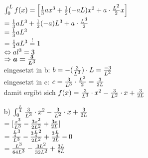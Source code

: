 \documentclass[a4paper]{article}
\begin{document}
\begin{description}
\begin{itemize}
									$\int_0^L f(x)= \left[\frac{1}{3}ax\textsuperscript{3}+\frac{1}{2}(-aL)x\textsuperscript{2}+a\cdot \frac{L\textsuperscript{2}}{2}x\right]$\\
									
									$=\frac{1}{3}aL\textsuperscript{3} + \frac{1}{2}(-a)L\textsuperscript{3} + a\cdot \frac{L\textsuperscript{3}}{2}$\\
									
									$=\frac{1}{3}aL\textsuperscript{3}$\\
									
									$=\frac{1}{3}aL\textsuperscript{3} \stackrel{!}{=} 1$\\
									
									$\Leftrightarrow al\textsuperscript{3}=3$\\
									
									$\Rightarrow \boldsymbol{a=\frac{3}{L\textsuperscript{3}}}$\\
									
									eingesetzt in b:
									$b=-(\frac{3}{L\textsuperscript{3}})\cdot L = \frac{-3}{L\textsuperscript{2}}$\\
									
									eingesetzt in c:
									$c=\frac{3}{L\textsuperscript{3}}\cdot \frac{L\textsuperscript{2}}{2}=\frac{3}{2L}$\\
									damit ergibt sich $f(x)=\frac{3}{L\textsuperscript{3}} \cdot x\textsuperscript{2}- \frac{3}{L\textsuperscript{2}} \cdot x + \frac{3}{2L}$\\
									
				\item[b)] $\int_0^\frac{L}{4} \frac{3}{L\textsuperscript{3}} \cdot x\textsuperscript{2}- \frac{3}{L\textsuperscript{2}} \cdot x + \frac{3}{2L}$\\
				
									$=[\frac{x\textsuperscript{3}}{L\textsuperscript{3}}-\frac{3x\textsuperscript{2}}{2L\textsuperscript{2}}+\frac{3x}{2L}]$\\
									
									$=\frac{\frac{L}{4}\textsuperscript{3}}{L\textsuperscript{3}} - \frac{3\frac{L}{4}\textsuperscript{2}}{2L\textsuperscript{2}} + \frac{3\frac{L}{4}}{2L} - 0$\\
									
									$=\frac{L\textsuperscript{3}}{64L\textsuperscript{3}} - \frac{3L\textsuperscript{2}}{32L\textsuperscript{2}} + \frac{3L}{8L}$\\
									

\end{itemize}
\end{description}
\end{document}
